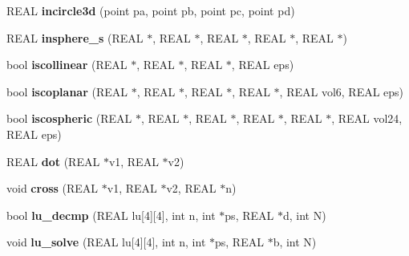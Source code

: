 \begin{DoxyCompactItemize}
\item 
\hypertarget{classtetgenmesh_adeb163031003774cc674a4cf88de1a74}{R\-E\-A\-L {\bfseries incircle3d} (point pa, point pb, point pc, point pd)}\label{classtetgenmesh_adeb163031003774cc674a4cf88de1a74}

\item 
\hypertarget{classtetgenmesh_ae0d6ddfffb8154c7658b8dd17fc51412}{R\-E\-A\-L {\bfseries insphere\-\_\-s} (R\-E\-A\-L $\ast$, R\-E\-A\-L $\ast$, R\-E\-A\-L $\ast$, R\-E\-A\-L $\ast$, R\-E\-A\-L $\ast$)}\label{classtetgenmesh_ae0d6ddfffb8154c7658b8dd17fc51412}

\item 
\hypertarget{classtetgenmesh_ab5d405dd717c352729acbe54e2ed6592}{bool {\bfseries iscollinear} (R\-E\-A\-L $\ast$, R\-E\-A\-L $\ast$, R\-E\-A\-L $\ast$, R\-E\-A\-L eps)}\label{classtetgenmesh_ab5d405dd717c352729acbe54e2ed6592}

\item 
\hypertarget{classtetgenmesh_af5e32a7a44663fd755adb66d03186c50}{bool {\bfseries iscoplanar} (R\-E\-A\-L $\ast$, R\-E\-A\-L $\ast$, R\-E\-A\-L $\ast$, R\-E\-A\-L $\ast$, R\-E\-A\-L vol6, R\-E\-A\-L eps)}\label{classtetgenmesh_af5e32a7a44663fd755adb66d03186c50}

\item 
\hypertarget{classtetgenmesh_a040069f64e73ad796b80fdbe0e21b563}{bool {\bfseries iscospheric} (R\-E\-A\-L $\ast$, R\-E\-A\-L $\ast$, R\-E\-A\-L $\ast$, R\-E\-A\-L $\ast$, R\-E\-A\-L $\ast$, R\-E\-A\-L vol24, R\-E\-A\-L eps)}\label{classtetgenmesh_a040069f64e73ad796b80fdbe0e21b563}

\item 
\hypertarget{classtetgenmesh_afa0906703b590597155547336c360004}{R\-E\-A\-L {\bfseries dot} (R\-E\-A\-L $\ast$v1, R\-E\-A\-L $\ast$v2)}\label{classtetgenmesh_afa0906703b590597155547336c360004}

\item 
\hypertarget{classtetgenmesh_a9b5ff4d3e2452044830fbd47d2f70cbd}{void {\bfseries cross} (R\-E\-A\-L $\ast$v1, R\-E\-A\-L $\ast$v2, R\-E\-A\-L $\ast$n)}\label{classtetgenmesh_a9b5ff4d3e2452044830fbd47d2f70cbd}

\item 
\hypertarget{classtetgenmesh_abc03dce4c75ad6ba7086269b1a71fd8b}{bool {\bfseries lu\-\_\-decmp} (R\-E\-A\-L lu\mbox{[}4\mbox{]}\mbox{[}4\mbox{]}, int n, int $\ast$ps, R\-E\-A\-L $\ast$d, int N)}\label{classtetgenmesh_abc03dce4c75ad6ba7086269b1a71fd8b}

\item 
\hypertarget{classtetgenmesh_a6a19601c86a49eed0d2273f1d3b69826}{void {\bfseries lu\-\_\-solve} (R\-E\-A\-L lu\mbox{[}4\mbox{]}\mbox{[}4\mbox{]}, int n, int $\ast$ps, R\-E\-A\-L $\ast$b, int N)}\label{classtetgenmesh_a6a19601c86a49eed0d2273f1d3b69826}


\end{DoxyCompactItemize}
